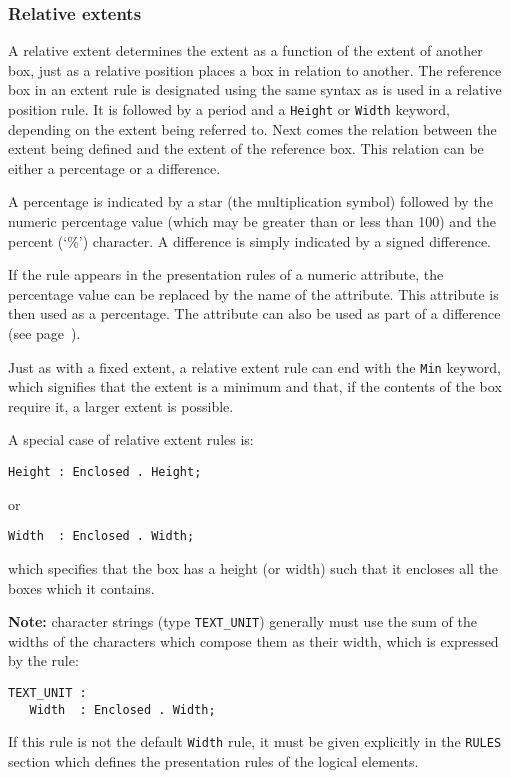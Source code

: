 \subsubsection{Relative extents}

A relative extent determines the extent as a function of the extent of
another box, just as a relative position places a box in relation to
another.  The reference box in an extent rule is designated using the
same syntax as is used in a relative position rule.  It is followed by
a period and a {\tt Height} or {\tt Width} keyword, depending on the
extent being referred to.  Next comes the relation between the
extent being defined and the extent of the reference box.  This
relation can be either a percentage or a difference.

A percentage is indicated by a star (the multiplication symbol)
followed by the numeric percentage value (which may be greater than or
less than 100) and the percent (`\%') character.  A difference
is simply indicated by a signed difference.

If the rule appears in the presentation rules of a numeric attribute,
the percentage value can be replaced by the name of the attribute.
This attribute is then used as a percentage.  The attribute can also
be used as part of a difference (see page~\pageref{distance}).

Just as with a fixed extent, a relative extent rule can end with the
{\tt Min} keyword, which signifies that the extent is a minimum and
that, if the contents of the box require it, a larger extent is
possible.

A special case of relative extent rules is:
\begin{verbatim}
Height : Enclosed . Height;
\end{verbatim}
or
\begin{verbatim}
Width  : Enclosed . Width;
\end{verbatim}
which specifies that the box has a height (or width) such that it
encloses all the boxes which it contains.

{\bf Note:} character strings (type {\tt TEXT\_UNIT}) generally must
use the sum of the widths of the characters which compose them as
their width, which is expressed by the rule:
\begin{verbatim}
TEXT_UNIT :
   Width  : Enclosed . Width;
\end{verbatim}
If this rule is not the default {\tt Width} rule, it must be given
explicitly in the {\tt RULES} section which defines the presentation
rules of the logical elements.

